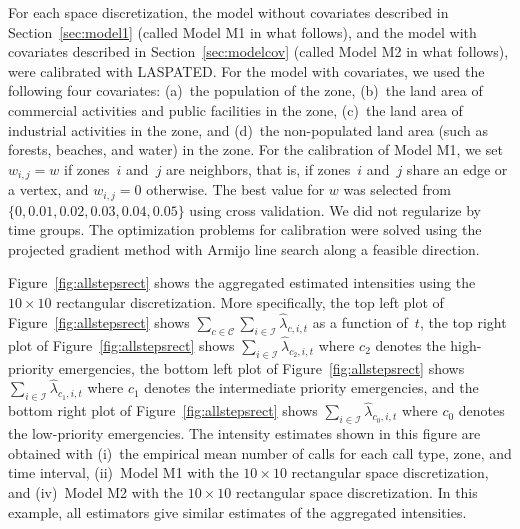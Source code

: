 \documentclass[article]{jss}
\begin{document}
For each space discretization, the model without covariates described in Section~\ref{sec:model1} (called Model M1 in what follows), and the model with covariates described in Section~\ref{sec:modelcov} (called Model M2 in what follows), were calibrated with LASPATED.
For the model with covariates, we used the following four covariates: (a)~the population of the zone, (b)~the land area of commercial activities and public facilities in the zone, (c)~the land area of industrial activities in the zone, and (d)~the non-populated land area (such as forests, beaches, and water) in the zone.
For the calibration of Model M1, we set $w_{i,j} = w$ if zones~$i$ and~$j$ are neighbors, that is, if zones~$i$ and~$j$ share an edge or a vertex, and $w_{i,j} = 0$ otherwise.
The best value for $w$ was selected from $\{0, 0.01, 0.02, 0.03, 0.04, 0.05 \}$ using cross validation.
We did not regularize by time groups. 
The optimization problems for calibration were solved using the projected gradient method with Armijo line search along a feasible direction.

Figure~\ref{fig:allstepsrect} shows the aggregated estimated intensities using the $10 \times 10$ rectangular discretization.
More specifically, the top left plot of Figure~\ref{fig:allstepsrect} shows $\sum_{c \in \mathcal{C}} \sum_{i \in \mathcal{I}} \hat{\lambda}_{c,i,t}$ as a function of~$t$, the top right plot of Figure~\ref{fig:allstepsrect} shows $\sum_{i \in \mathcal{I}} \hat{\lambda}_{c_{2},i,t}$ where $c_{2}$ denotes the high-priority emergencies, the bottom left plot of Figure~\ref{fig:allstepsrect} shows $\sum_{i \in \mathcal{I}} \hat{\lambda}_{c_{1},i,t}$ where $c_{1}$ denotes the intermediate priority emergencies, and the bottom right plot of Figure~\ref{fig:allstepsrect} shows $\sum_{i \in \mathcal{I}} \hat{\lambda}_{c_{0},i,t}$ where $c_{0}$ denotes the low-priority emergencies.
The intensity estimates shown in this figure are obtained with (i)~the empirical mean number of calls for each call type, zone, and time interval, (ii)~Model M1 with the $10 \times 10$ rectangular space discretization, and (iv)~Model M2 with the $10 \times 10$ rectangular space discretization.
In  this example, all estimators give similar estimates of the aggregated intensities.
\end{document}
